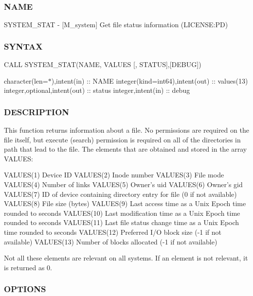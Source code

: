 \subsubsection*{N\+A\+ME}

S\+Y\+S\+T\+E\+M\+\_\+\+S\+T\+AT -\/ \mbox{[}M\+\_\+system\mbox{]} Get file status information (L\+I\+C\+E\+N\+SE\+:PD) 

\subsubsection*{S\+Y\+N\+T\+AX}

C\+A\+LL S\+Y\+S\+T\+E\+M\+\_\+\+S\+T\+A\+T(\+N\+A\+M\+E, V\+A\+L\+U\+E\+S \mbox{[}, S\+T\+A\+T\+U\+S\mbox{]},\mbox{[}\+D\+E\+B\+U\+G\mbox{]})

character(len=$\ast$),intent(in) \+:\+: N\+A\+ME integer(kind=int64),intent(out) \+:\+: values(13) integer,optional,intent(out) \+:\+: status integer,intent(in) \+:\+: debug

\subsubsection*{D\+E\+S\+C\+R\+I\+P\+T\+I\+ON}

\begin{DoxyVerb}This function returns information about a file. No permissions are
required on the file itself, but execute (search) permission is required
on all of the directories in path that lead to the file. The elements
that are obtained and stored in the array VALUES:

   VALUES(1) Device ID
   VALUES(2) Inode number
   VALUES(3) File mode
   VALUES(4) Number of links
   VALUES(5) Owner's uid
   VALUES(6) Owner's gid
   VALUES(7) ID of device containing directory entry for file (0 if not available)
   VALUES(8) File size (bytes)
   VALUES(9) Last access time as a Unix Epoch time rounded to seconds
   VALUES(10) Last modification time as a Unix Epoch time rounded to seconds
   VALUES(11) Last file status change time as a Unix Epoch time rounded to seconds
   VALUES(12) Preferred I/O block size (-1 if not available)
   VALUES(13) Number of blocks allocated (-1 if not available)

Not all these elements are relevant on all systems. If an element is
not relevant, it is returned as 0.
\end{DoxyVerb}


\subsubsection*{O\+P\+T\+I\+O\+NS}

